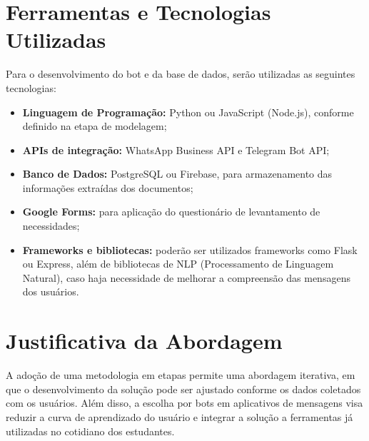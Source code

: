 \section{Ferramentas e Tecnologias Utilizadas}

Para o desenvolvimento do bot e da base de dados, serão utilizadas as seguintes tecnologias:

\begin{itemize}
    \item \textbf{Linguagem de Programação:} Python ou JavaScript (Node.js), conforme definido na etapa de modelagem;
    \item \textbf{APIs de integração:} WhatsApp Business API e Telegram Bot API;
    \item \textbf{Banco de Dados:} PostgreSQL ou Firebase, para armazenamento das informações extraídas dos documentos;
    \item \textbf{Google Forms:} para aplicação do questionário de levantamento de necessidades;
    \item \textbf{Frameworks e bibliotecas:} poderão ser utilizados frameworks como Flask ou Express, além de bibliotecas de NLP (Processamento de Linguagem Natural), caso haja necessidade de melhorar a compreensão das mensagens dos usuários.
\end{itemize}

\section{Justificativa da Abordagem}

A adoção de uma metodologia em etapas permite uma abordagem iterativa, em que o desenvolvimento da solução pode ser ajustado conforme os dados coletados com os usuários. Além disso, a escolha por bots em aplicativos de mensagens visa reduzir a curva de aprendizado do usuário e integrar a solução a ferramentas já utilizadas no cotidiano dos estudantes.

